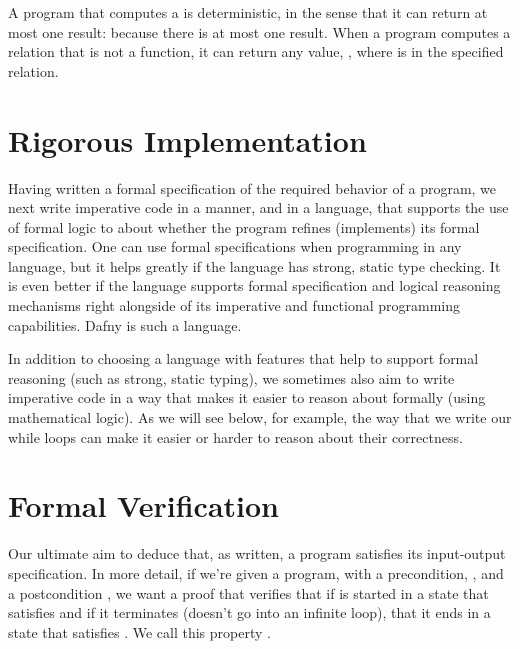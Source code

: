 \documentclass[letterpaper,10pt,english]{sphinxmanual}
\begin{document}
A program that computes a  is deterministic, in the sense
that it can return at most one result: because there is at most one
result. When a program computes a relation that is not a function, it
can return any value, , where  is in the specified relation.


\section{Rigorous Implementation}
\label{\detokenize{05-putting-it-together:rigorous-implementation}}
Having written a formal specification of the required 
behavior of a program, we next write imperative code in a manner, and
in a language, that supports the use of formal logic to  about
whether the program refines (implements) its formal specification. One
can use formal specifications when programming in any language, but it
helps greatly if the language has strong, static type checking. It is
even better if the language supports formal specification and logical
reasoning mechanisms right alongside of its imperative and functional
programming capabilities. Dafny is such a language.

In addition to choosing a language with features that help to support
formal reasoning (such as strong, static typing), we sometimes also
aim to write imperative code in a way that makes it easier to reason
about formally (using mathematical logic). As we will see below, for
example, the way that we write our while loops can make it easier or
harder to reason about their correctness.


\section{Formal Verification}
\label{\detokenize{05-putting-it-together:formal-verification}}
Our ultimate aim to deduce that, as written, a program satisfies its
input-output specification.  In more detail, if we’re given a program,
 with a precondition, , and a postcondition , we want a proof
that verifies that if  is started in a state that satisfies  and
if it terminates (doesn’t go into an infinite loop), that it ends in a
state that satisfies . We call this property .
\end{document}
